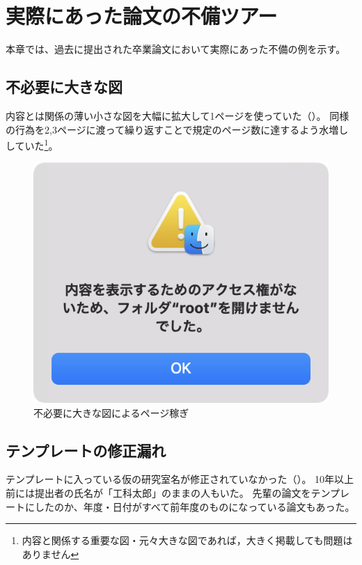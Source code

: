 \chapter{実際にあった論文の不備ツアー}

本章では、過去に提出された卒業論文において実際にあった不備の例を示す。


\section{不必要に大きな図}

内容とは関係の薄い小さな図を大幅に拡大して1ページを使っていた（）。
同様の行為を2,3ページに渡って繰り返すことで規定のページ数に達するよう水増ししていた\footnote{内容と関係する重要な図・元々大きな図であれば，大きく掲載しても問題はありません}。


\begin{figure}[H]
  \centering
  \includegraphics[width=.90\linewidth]{fig/fail-root.png}
  \caption{不必要に大きな図によるページ稼ぎ}
  \label{fig:fail-root}
\end{figure}


\section{テンプレートの修正漏れ}

テンプレートに入っている仮の研究室名が修正されていなかった（）。
10年以上前には提出者の氏名が「工科太郎」のままの人もいた。
先輩の論文をテンプレートにしたのか、年度・日付がすべて前年度のものになっている論文もあった。

